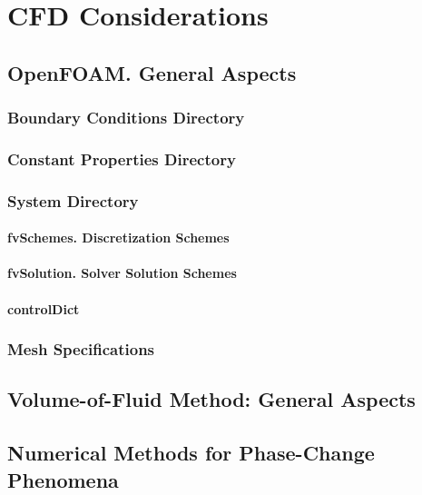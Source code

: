
\chapter{CFD Considerations} %

\label{Chapter2} %



\section{OpenFOAM. General Aspects}
\subsection{Boundary Conditions Directory}
\subsection{Constant Properties Directory}
\subsection{System Directory}
\subsubsection{fvSchemes. Discretization Schemes}
\subsubsection{fvSolution. Solver Solution Schemes}
\subsubsection{controlDict}
\subsection{Mesh Specifications}
\section{Volume-of-Fluid Method: General Aspects}
\section{Numerical Methods for Phase-Change Phenomena}
